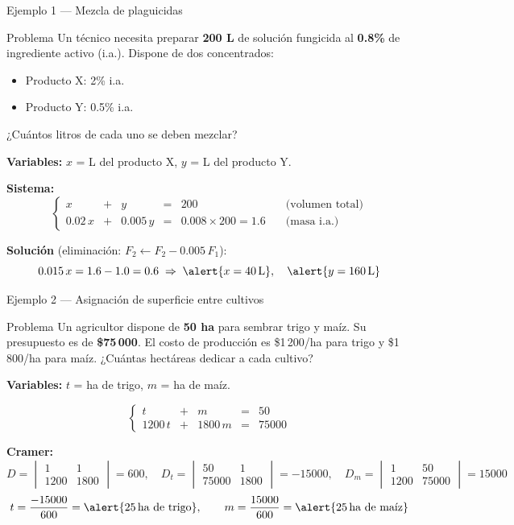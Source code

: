 \documentclass[11pt, aspectratio=169]{beamer}
\newcommand{\deter}[4]{\begin{vmatrix} #1 & #2 \\ #3 & #4 \end{vmatrix}}
\begin{document}
\begin{frame}{Ejemplo 1 — Mezcla de plaguicidas}
  \begin{exampleblock}{Problema}
    Un técnico necesita preparar \textbf{200 L} de solución fungicida
    al \textbf{0.8\%} de ingrediente activo (i.a.).
    Dispone de dos concentrados:
    \begin{itemize}
      \item Producto X: 2\% i.a. \quad
      \item Producto Y: 0.5\% i.a.
    \end{itemize}
    ¿Cuántos litros de cada uno se deben mezclar?
  \end{exampleblock}

  \pause
  \textbf{Variables:} $x$ = L del producto X, \; $y$ = L del producto Y.

  \pause
  \textbf{Sistema:}
  \[
    \left\{
    \begin{array}{rcrcrl}
      x & + & y & = & 200 & \quad\text{(volumen total)}\\[4pt]
      0.02\,x & + & 0.005\,y & = & 0.008 \times 200 = 1.6 & \quad\text{(masa i.a.)}
    \end{array}
    \right.
  \]

  \pause
  \textbf{Solución} (eliminación: $F_2 \leftarrow F_2 - 0.005\,F_1$):
  \[
    0.015\,x = 1.6 - 1.0 = 0.6
    \;\Rightarrow\; \alert{x = 40\,\text{L}}, \quad \alert{y = 160\,\text{L}}
  \]
\end{frame}

\begin{frame}{Ejemplo 2 — Asignación de superficie entre cultivos}
  \begin{exampleblock}{Problema}
    Un agricultor dispone de \textbf{50 ha} para sembrar trigo y maíz.
    Su presupuesto es de \textbf{\$75\,000}.
    El costo de producción es \$1\,200/ha para trigo y \$1\,800/ha para maíz.
    ¿Cuántas hectáreas dedicar a cada cultivo?
  \end{exampleblock}

  \pause
  \textbf{Variables:} $t$ = ha de trigo, \; $m$ = ha de maíz.

  \[
    \left\{
    \begin{array}{rcrcr}
      t & + & m & = & 50 \\[4pt]
      1200\,t & + & 1800\,m & = & 75000
    \end{array}
    \right.
  \]

  \pause
  \textbf{Cramer:}
  \[
    D = \deter{1}{1}{1200}{1800} = 600, \quad
    D_t = \deter{50}{1}{75000}{1800} = -\!15000, \quad
    D_m = \deter{1}{50}{1200}{75000} = 15000
  \]
  \pause
  \[
    t = \frac{-15000}{600}= \alert{25\,\text{ha de trigo}}, \qquad
    m = \frac{15000}{600} = \alert{25\,\text{ha de maíz}}
  \]
\end{frame}
\end{document}
